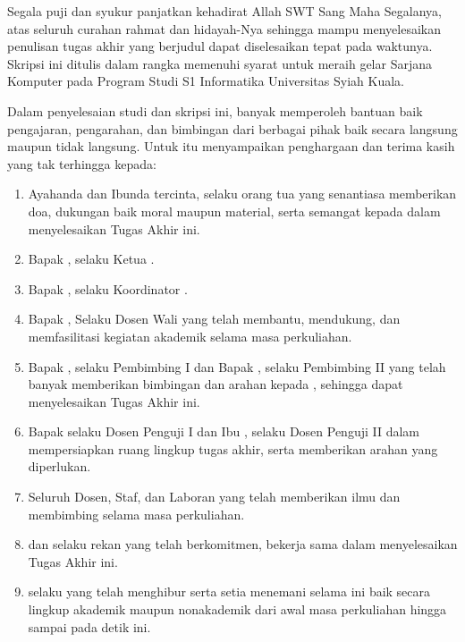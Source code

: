 \preface %

Segala puji dan syukur \saya{} panjatkan kehadirat Allah SWT Sang Maha Segalanya, atas seluruh curahan rahmat dan hidayah-Nya sehingga \saya{} mampu menyelesaikan penulisan tugas akhir yang berjudul \MakeUppercase{\textbf{\Judul}} dapat diselesaikan tepat pada waktunya. Skripsi ini ditulis dalam rangka memenuhi syarat untuk meraih gelar Sarjana Komputer pada Program Studi S1 Informatika Universitas Syiah Kuala. 

Dalam penyelesaian studi dan skripsi ini, \saya{} banyak memperoleh bantuan baik pengajaran, pengarahan, dan bimbingan dari berbagai pihak baik secara langsung maupun tidak langsung. Untuk itu \saya{} menyampaikan penghargaan dan terima kasih yang tak terhingga kepada: 

\begin{enumerate}
    \item Ayahanda dan Ibunda tercinta, selaku orang tua \saya{} yang senantiasa memberikan doa, dukungan baik moral maupun material, serta semangat kepada \saya{} dalam menyelesaikan Tugas Akhir ini.
    \item Bapak \kadep{}, selaku Ketua \departemen{} \universitas.
    \item Bapak \kaprodi{}, selaku Koordinator \programstudi{} \universitas{}.
    \item Bapak \doswal{}, Selaku Dosen Wali yang telah membantu, mendukung, dan memfasilitasi kegiatan akademik selama masa perkuliahan.
    \item Bapak \pembimbingSatu{}, selaku Pembimbing I dan Bapak \pembimbingDua{}, selaku Pembimbing II yang telah banyak memberikan bimbingan dan arahan kepada \saya{}, sehingga \saya{} dapat menyelesaikan Tugas Akhir ini.
    \item Bapak \pengujiSatu{} selaku Dosen Penguji I dan Ibu \pengujiDua{}, selaku Dosen Penguji II dalam mempersiapkan ruang lingkup tugas akhir, serta memberikan arahan yang diperlukan.
    \item Seluruh Dosen, Staf, dan Laboran \programstudi{} \FakultasMIPA{} \universitas{} yang telah memberikan ilmu dan membimbing selama masa perkuliahan.
    \item \rekanSatu{} dan \rekanDua{} selaku rekan \saya{} yang telah berkomitmen, bekerja sama dalam menyelesaikan Tugas Akhir ini.
    \item \masbroo{} selaku \Masbroo{} yang telah menghibur serta setia menemani \saya{} selama ini baik secara lingkup akademik maupun nonakademik dari awal masa perkuliahan hingga sampai pada detik ini.
\end{enumerate}

